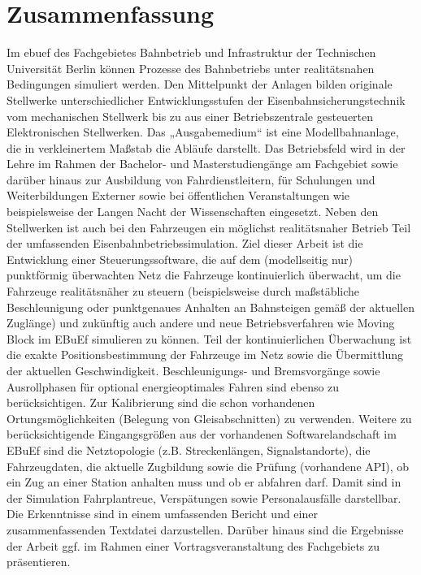\section*{Zusammenfassung}
Im \ac{ebuef} des Fachgebietes Bahnbetrieb und Infrastruktur der Technischen Universität Berlin können Prozesse des Bahnbetriebs unter realitätsnahen Bedingungen simuliert werden. Den Mittelpunkt der Anlagen bilden originale Stellwerke unterschiedlicher Entwicklungsstufen der Eisenbahnsicherungstechnik vom mechanischen Stellwerk bis zu aus einer Betriebszentrale gesteuerten Elektronischen Stellwerken. Das „Ausgabemedium“ ist eine Modellbahnanlage, die in verkleinertem Maßstab die Abläufe darstellt. Das Betriebsfeld wird in der Lehre im Rahmen der Bachelor- und Masterstudiengänge am Fachgebiet sowie darüber hinaus zur Ausbildung von Fahrdienstleitern, für Schulungen und Weiterbildungen Externer sowie bei öffentlichen Veranstaltungen wie beispielsweise der Langen Nacht der Wissenschaften eingesetzt. Neben den Stellwerken ist auch bei den Fahrzeugen ein möglichst realitätsnaher Betrieb Teil der umfassenden Eisenbahnbetriebssimulation. Ziel dieser Arbeit ist die Entwicklung einer Steuerungssoftware, die auf dem (modellseitig nur) punktförmig überwachten Netz die Fahrzeuge kontinuierlich überwacht, um die Fahrzeuge realitätsnäher zu steuern (beispielsweise durch maßstäbliche Beschleunigung oder punktgenaues Anhalten an Bahnsteigen gemäß der aktuellen Zuglänge) und zukünftig auch andere und neue Betriebsverfahren wie Moving Block im EBuEf simulieren zu können. Teil der kontinuierlichen Überwachung ist die exakte Positionsbestimmung der Fahrzeuge im Netz sowie die Übermittlung der aktuellen Geschwindigkeit. Beschleunigungs- und Bremsvorgänge sowie Ausrollphasen für optional energieoptimales Fahren sind ebenso zu berücksichtigen. Zur Kalibrierung sind die schon vorhandenen Ortungsmöglichkeiten (Belegung von Gleisabschnitten) zu verwenden. Weitere zu berücksichtigende Eingangsgrößen aus der vorhandenen Softwarelandschaft im EBuEf sind die Netztopologie (z.B. Streckenlängen, Signalstandorte), die Fahrzeugdaten, die aktuelle Zugbildung sowie die Prüfung (vorhandene API), ob ein Zug an einer Station anhalten muss und ob er abfahren darf. Damit sind in der Simulation Fahrplantreue, Verspätungen sowie Personalausfälle darstellbar. Die Erkenntnisse sind in einem umfassenden Bericht und einer zusammenfassenden Textdatei darzustellen. Darüber hinaus sind die Ergebnisse der Arbeit ggf. im Rahmen einer Vortragsveranstaltung des Fachgebiets zu präsentieren. 

